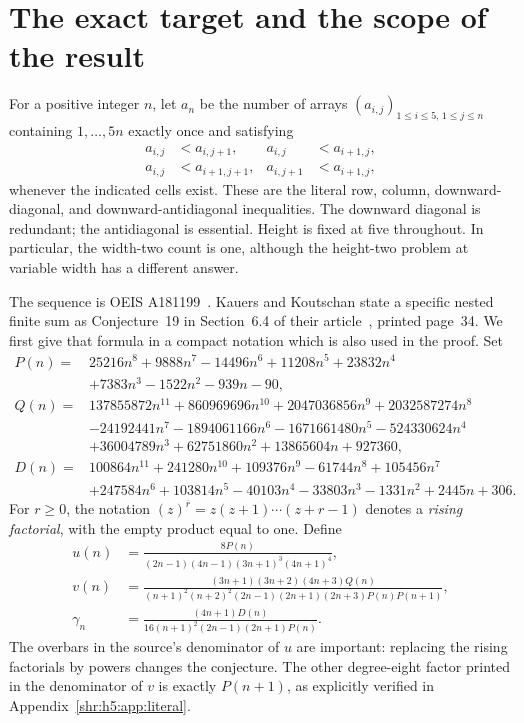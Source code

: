 \documentclass[11pt,letterpaper]{article}
\numberwithin{equation}{section}
\theoremstyle{definition}
\newcommand{\1}{\mathbf 1}
\newcommand{\rise}[2]{(#1)^{\overline{#2}}}
\begin{document}
\section{The exact target and the scope of the result}
\label{shr:h5:sec:scope}
For a positive integer $n$, let $a_n$ be the number of arrays
$(a_{i,j})_{1\le i\le5,\,1\le j\le n}$ containing $1,\ldots,5n$ exactly
once and satisfying
\begin{equation}
\begin{aligned}
 a_{i,j}&<a_{i,j+1},& a_{i,j}&<a_{i+1,j},\\
 a_{i,j}&<a_{i+1,j+1},& a_{i,j+1}&<a_{i+1,j},
\end{aligned}
\label{shr:h5:eq:arrays}
\end{equation}
whenever the indicated cells exist. These are the literal row, column,
downward-diagonal, and downward-antidiagonal inequalities. The downward
diagonal is redundant; the antidiagonal is essential. Height is fixed at
five throughout. In particular, the width-two count is one, although the
height-two problem at variable width has a different answer.

The sequence is OEIS A181199~\cite{oeis199int}. Kauers and Koutschan state a
specific nested finite sum as Conjecture~19 in Section~6.4 of their
article~\cite{KK}, printed page~34. We first give that formula in a compact
notation which is also used in the proof. Set
\begin{align}
 P(n)={}&25216n^8+9888n^7-14496n^6+11208n^5+23832n^4\\
       &+7383n^3-1522n^2-939n-90,\\
 Q(n)={}&137855872n^{11}+860969696n^{10}+2047036856n^9
          +2032587274n^8\\
       &-24192441n^7-1894061166n^6-1671661480n^5
          -524330624n^4\\
       &+36004789n^3+62751860n^2+13865604n+927360,\\
 D(n)={}&100864n^{11}+241280n^{10}+109376n^9-61744n^8
          +105456n^7\\
       &+247584n^6+103814n^5-40103n^4-33803n^3
          -1331n^2+2445n+306.
 \label{shr:h5:eq:PQD}
\end{align}
For $r\ge0$, the notation $\rise zr=z(z+1)\cdots(z+r-1)$ denotes a
\emph{rising factorial}, with the empty product equal to one. Define
\begin{align}
 u(n)&=\frac{8P(n)}{(2n-1)(4n-1)\rise{3n+1}{3}\rise{4n+1}{4}},
 \label{shr:h5:eq:u}\\
 v(n)&=\frac{(3n+1)(3n+2)(4n+3)Q(n)}
 {(n+1)^2(n+2)^2(2n-1)(2n+1)(2n+3)P(n)P(n+1)},
 \label{shr:h5:eq:v}\\
 \gamma_n&=\frac{(4n+1)D(n)}{16(n+1)^2(2n-1)(2n+1)P(n)}.
 \label{shr:h5:eq:gamma}
\end{align}
The overbars in the source's denominator of $u$ are important: replacing
the rising factorials by powers changes the conjecture. The other
degree-eight factor printed in the denominator of $v$ is exactly
$P(n+1)$, as explicitly verified in Appendix~\ref{shr:h5:app:literal}.
\end{document}
